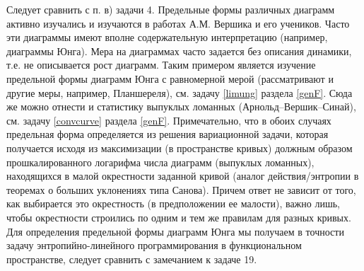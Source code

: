 \begin{problem} 
\begin{remark}
Следует сравнить с п. в) задачи 4. Предельные формы 
различных диаграмм активно изучались и изучаются в работах А.М. Вершика и 
его учеников. Часто эти диаграммы имеют вполне содержательную интерпретацию 
(например, диаграммы Юнга). Мера на диаграммах часто задается без описания 
динамики, т.е. не описывается рост диаграмм. Таким примером является 
изучение предельной формы диаграмм Юнга с равномерной мерой (рассматривают и 
другие меры, например, Планшереля), см. задачу \ref{limung} раздела \ref{genF}. 
Сюда же можно отнести и статистику выпуклых ломанных 
(Арнольд--Вершик--Синай), см. задачу \ref{convcurve} раздела \ref{genF}. 
Примечательно, что в обоих случаях предельная форма определяется из решения 
вариационной задачи, которая получается исходя из максимизации (в 
пространстве кривых) должным образом прошкалированного логарифма числа 
диаграмм (выпуклых ломанных), находящихся в малой окрестности заданной 
кривой (аналог действия/энтропии в теоремах о больших уклонениях типа 
Санова). Причем ответ не 
зависит от того, как выбирается это окрестность (в предположении ее 
малости), важно лишь, чтобы окрестности строились по одним и тем же правилам 
для разных кривых.
Для определения предельной формы диаграмм Юнга мы получаем 
в точности задачу энтропийно-линейного программирования в функциональном 
пространстве, следует сравнить с замечанием к задаче 19.
\end{remark} 

\end{problem}


